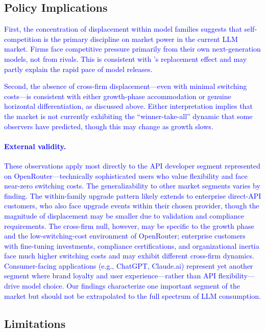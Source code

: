 \documentclass[11pt, a4paper]{article}
\begin{document}
\subsection{Policy Implications}

\textcolor{blue}{First, the concentration of displacement within model families suggests that self-competition is the primary discipline on market power in the current LLM market. Firms face competitive pressure primarily from their own next-generation models, not from rivals. This is consistent with \citet{arrow1962economic}'s replacement effect and may partly explain the rapid pace of model releases.}

\textcolor{blue}{Second, the absence of cross-firm displacement---even with minimal switching costs---is consistent with either growth-phase accommodation or genuine horizontal differentiation, as discussed above. Either interpretation implies that the market is not currently exhibiting the ``winner-take-all'' dynamic that some observers have predicted, though this may change as growth slows.}

\textcolor{blue}{\paragraph{External validity.} These observations apply most directly to the API developer segment represented on OpenRouter---technically sophisticated users who value flexibility and face near-zero switching costs. The generalizability to other market segments varies by finding. The within-family upgrade pattern likely extends to enterprise direct-API customers, who also face upgrade events within their chosen provider, though the magnitude of displacement may be smaller due to validation and compliance requirements. The cross-firm null, however, may be specific to the growth phase and the low-switching-cost environment of OpenRouter; enterprise customers with fine-tuning investments, compliance certifications, and organizational inertia face much higher switching costs and may exhibit different cross-firm dynamics. Consumer-facing applications (e.g., ChatGPT, Claude.ai) represent yet another segment where brand loyalty and user experience---rather than API flexibility---drive model choice. Our findings characterize one important segment of the market but should not be extrapolated to the full spectrum of LLM consumption.}

\subsection{Limitations}
\end{document}
